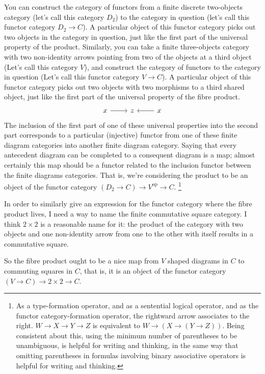 \documentclass[11pt,noamsfonts]{amsart}
\DeclareMathOperator{\op}{op}
\begin{document}
You can construct the category of functors from a finite discrete two-objects category (let's call this category \(D_2\)) to the category in question (let's call this functor category \( D_2 \to C \)). A particular object of this functor category picks out two objects in the category in question, just like the first part of the universal property of the product.
Similarly, you can take a finite three-objects category with two non-identity arrows pointing from two of the objects at a third object (Let's call this category \( V \)), and construct the category of functors to the category in question (Let's call this functor category \( V \to C \)). A particular object of this functor category picks out two objects with two morphisms to a third shared object, just like the first part of the universal property of the fibre product.
\[
\begin{tikzcd}
x \arrow[r] & z & x \arrow[l]
\end{tikzcd}
\]
The inclusion of the first part of one of these universal properties into the second part corresponds to a particular (injective) functor from one of these finite diagram categories into another finite diagram category. Saying that every antecedent diagram can be completed to a consequent diagram is a map; almost certainly this map should be a functor related to the inclusion functor between the finite diagrams categories. That is, we're considering the product to be an object of the functor category \( (D_2 \to C) \to V^{\op} \to C \). \footnote{As a type-formation operator, and as a sentential logical operator, and as the functor category-formation operator, the rightward arrow associates to the right. \( W \to X \to Y \to Z\) is equivalent to \( W \to (X \to (Y \to Z)) \). Being consistent about this, using the minimum number of parentheses to be unambiguous, is helpful for writing and thinking, in the same way that omitting parentheses in formulas involving binary associative operators is helpful for writing and thinking.}

In order to similarly give an expression for the functor category where the fibre product lives, I need a way to name the finite commutative square category. I think \( 2 \times 2 \) is a reasonable name for it: the product of the category with two objects and one non-identity arrow from one to the other with itself results in a commutative square.

So the fibre product ought to be a nice map from \( V \) shaped diagrams in \( C \) to commuting squares in \( C \), that is, it is an object of the functor category \( (V \to C) \to 2 \times 2 \to C \).
\end{document}

